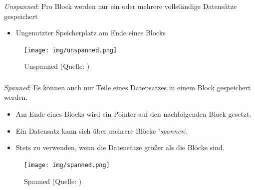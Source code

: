\begin{frame}
\frametitle{\insertsection}
\framesubtitle{\insertsubsection}
\abs
\emph{Unspanned}: Pro Block werden nur ein oder mehrere vollst\"andige Datens\"atze gespeichert
	\begin{itemize}
		\item Ungenutzter Speicherplatz am Ende eines Blocks
	\end{itemize}
  \begin{figure}
	 \texttt{[image: img/unspanned.png]}
	 \caption{Unspanned (Quelle: \cite[S. 598]{EN10})}
  \end{figure}
\end{frame}


\begin{frame}
\frametitle{\insertsection}
\framesubtitle{\insertsubsection}
\abs
\emph{Spanned}: Es können auch nur Teile eines Datensatzes in einem Block gespeichert werden. 
	\begin{itemize}
		\item Am Ende eines Blocks wird ein Pointer auf den nachfolgenden Block gesetzt.
		\item Ein Datensatz kann sich \"uber mehrere Bl\"ocke '\textit{spannen}'.
		\item Stets zu verwenden, wenn die Datens\"atze gr\"o\ss er als die Bl\"ocke sind. 
	\end{itemize}
  \begin{figure}
 	 \texttt{[image: img/spanned.png]}
	 \caption{Spanned (Quelle: \cite[S. 598]{EN10})}
  \end{figure}
\end{frame}

